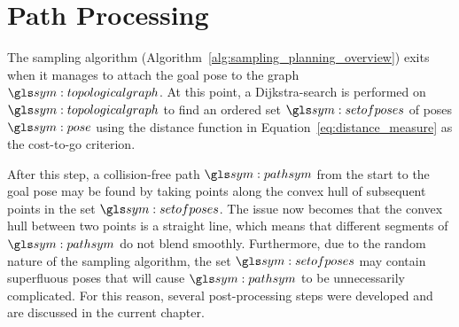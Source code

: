 \chapter{Path Processing}%
\label{chap:path_processing}

	The sampling algorithm (Algorithm~\ref{alg:sampling_planning_overview})
	exits when it manages to attach the goal pose to the graph
	$\topologicalgraph$. At this point, a Dijkstra-search is performed on
	$\topologicalgraph$ to find an ordered set $\setofposes$ of poses $\pose$
	using the distance function in Equation~\ref{eq:distance_measure} as the
	cost-to-go criterion.

	After this step, a collision-free path $\pathsym$ from the start to the goal
	pose may be found by taking points along the convex hull of subsequent
	points in the set $\setofposes$. The issue now becomes that the convex hull
	between two points is a straight line, which means that different segments
	of $\pathsym$ do not blend smoothly. Furthermore, due to the random nature
	of the sampling algorithm, the set $\setofposes$ may contain superfluous
	poses that will cause $\pathsym$ to be unnecessarily complicated. For this
	reason, several post-processing steps were developed and are discussed in
	the current chapter.

	
	
	

